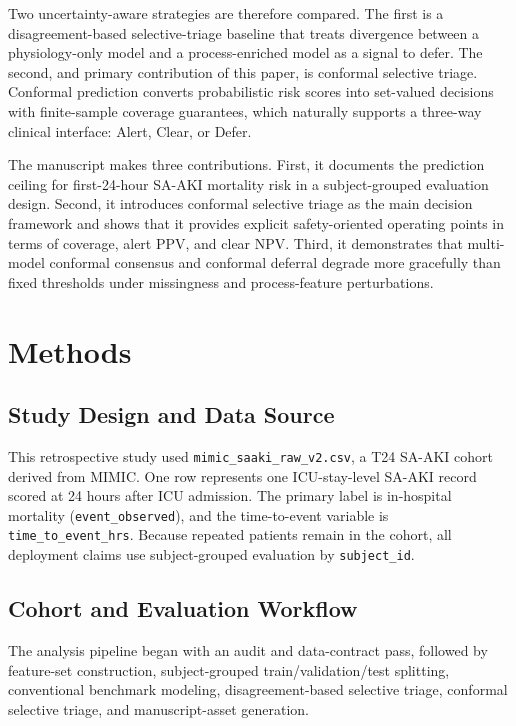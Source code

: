 \documentclass[unnumsec,webpdf,contemporary,large,numbered,nocrop]{oup-authoring-template}
\begin{document}
Two uncertainty-aware strategies are therefore compared. The first is a disagreement-based selective-triage baseline that treats divergence between a physiology-only model and a process-enriched model as a signal to defer. The second, and primary contribution of this paper, is conformal selective triage. Conformal prediction converts probabilistic risk scores into set-valued decisions with finite-sample coverage guarantees, which naturally supports a three-way clinical interface: Alert, Clear, or Defer.\cite{vovk2005algorithmic,angelopoulos2021gentle}

The manuscript makes three contributions. First, it documents the prediction ceiling for first-24-hour SA-AKI mortality risk in a subject-grouped evaluation design. Second, it introduces conformal selective triage as the main decision framework and shows that it provides explicit safety-oriented operating points in terms of coverage, alert PPV, and clear NPV. Third, it demonstrates that multi-model conformal consensus and conformal deferral degrade more gracefully than fixed thresholds under missingness and process-feature perturbations.

\section{Methods}
\subsection{Study Design and Data Source}
This retrospective study used \texttt{mimic\_saaki\_raw\_v2.csv}, a T24 SA-AKI cohort derived from MIMIC.\cite{johnson2016mimic} One row represents one ICU-stay-level SA-AKI record scored at 24 hours after ICU admission. The primary label is in-hospital mortality (\texttt{event\_observed}), and the time-to-event variable is \texttt{time\_to\_event\_hrs}. Because repeated patients remain in the cohort, all deployment claims use subject-grouped evaluation by \texttt{subject\_id}.

\subsection{Cohort and Evaluation Workflow}
The analysis pipeline began with an audit and data-contract pass, followed by feature-set construction, subject-grouped train/validation/test splitting, conventional benchmark modeling, disagreement-based selective triage, conformal selective triage, and manuscript-asset generation.
\end{document}
